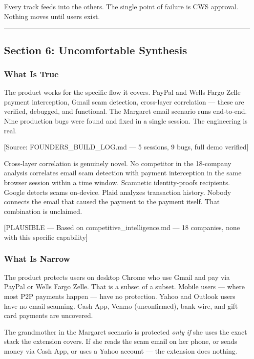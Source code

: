 \documentclass[11pt, letterpaper]{article}
\newcommand{\source}[1]{\textcolor{citation}{[Source: #1]}}
\newcommand{\plausmark}[1]{\textcolor{plausible}{[PLAUSIBLE --- #1]}}
\begin{document}
  Every track feeds into the others. The single point of failure is CWS approval. Nothing moves until users exist.

  \vspace{12pt}
  \hrule
  \vspace{12pt}

  \subsection{Section 6: Uncomfortable Synthesis}

  \subsubsection{What Is True}

  The product works for the specific flow it covers. PayPal and Wells Fargo Zelle payment interception, Gmail scam detection, cross-layer correlation --- these are verified, debugged, and functional. The Margaret email scenario runs end-to-end. Nine production bugs were found and fixed in a single session. The engineering is real.

  \source{FOUNDERS\_BUILD\_LOG.md --- 5 sessions, 9 bugs, full demo verified}

  Cross-layer correlation is genuinely novel. No competitor in the 18-company analysis correlates email scam detection with payment interception in the same browser session within a time window. Scamnetic identity-proofs recipients. Google detects scams on-device. Plaid analyzes transaction history. Nobody connects the email that caused the payment to the payment itself. That combination is unclaimed.

  \plausmark{Based on competitive\_intelligence.md --- 18 companies, none with this specific capability}

  \subsubsection{What Is Narrow}

  The product protects users on desktop Chrome who use Gmail and pay via PayPal or Wells Fargo Zelle. That is a subset of a subset. Mobile users --- where most P2P payments happen --- have no protection. Yahoo and Outlook users have no email scanning. Cash App, Venmo (unconfirmed), bank wire, and gift card payments are uncovered.

  The grandmother in the Margaret scenario is protected \textit{only if} she uses the exact stack the extension covers. If she reads the scam email on her phone, or sends money via Cash App, or uses a Yahoo account --- the extension does nothing.
\end{document}
